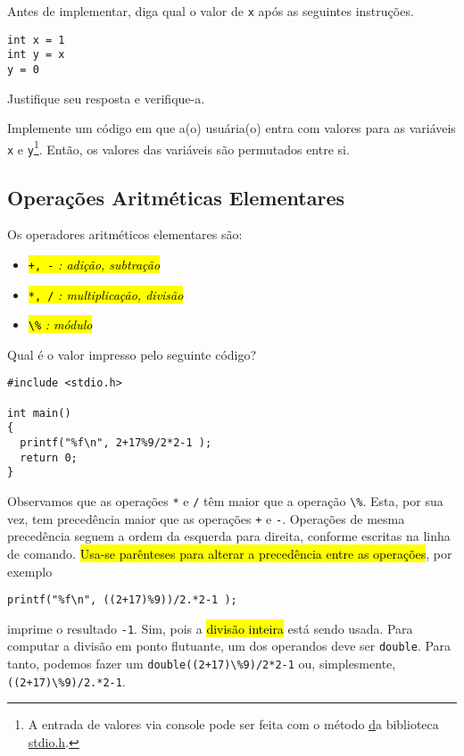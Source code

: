 \documentclass[12pt]{article}
\begin{document}
\begin{exr}
  Antes de implementar, diga qual o valor de \lstinline+x+ após as seguintes instruções.
\begin{lstlisting}
int x = 1
int y = x
y = 0
\end{lstlisting}
  Justifique seu resposta e verifique-a.
\end{exr}

\begin{exr}
  Implemente um código em que a(o) usuária(o) entra com valores para as variáveis \lstinline+x+ e \lstinline+y+\footnote{A entrada de valores via console pode ser feita com o método \href{https://cplusplus.com/reference/cstdio/scanf} da biblioteca \href{https://cplusplus.com/reference/cstdio}{stdio.h}.}. Então, os valores das variáveis são permutados entre si.
\end{exr}

\subsection{Operações Aritméticas Elementares}

Os operadores aritméticos elementares são:
\begin{itemize}
\item[]\hl{{\lstinline!+, -!} \emph{: adição, subtração}}
\item[]\hl{{\lstinline+*, /+} \emph{: multiplicação, divisão}}
\item[]\hl{{\lstinline+\%+} \emph{: módulo}}
\end{itemize}

\begin{ex}
  Qual é o valor impresso pelo seguinte código?
\begin{lstlisting}
#include <stdio.h>

int main()
{
  printf("%f\n", 2+17%9/2*2-1 );
  return 0;
}
\end{lstlisting}

  Observamos que as operações {\lstinline+*+} e {\lstinline+/+} têm  maior que a operação \lstinline+\%+. Esta, por sua vez, tem precedência maior que as operações {\lstinline!+!} e {\lstinline!-!}. Operações de mesma precedência seguem a ordem da esquerda para direita, conforme escritas na linha de comando. \hl{Usa-se parênteses para alterar a precedência entre as operações}, por exemplo
\begin{lstlisting}
printf("%f\n", ((2+17)%9))/2.*2-1 );
\end{lstlisting}
imprime o resultado \lstinline!-1!. Sim, pois a \hl{divisão inteira} está sendo usada. Para computar a divisão em ponto flutuante, um dos operandos deve ser \lstinline!double!. Para tanto, podemos fazer um  \lstinline!double((2+17)\%9)/2*2-1! ou, simplesmente, \lstinline!((2+17)\%9)/2.*2-1!.
\end{ex}
\end{document}
